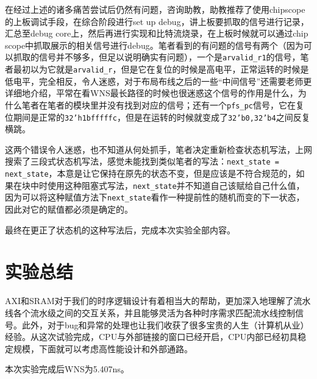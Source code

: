 \documentclass[UTF-8,twoside,c5size]{ctexart}
\begin{document}
    在经过上述的诸多痛苦尝试后仍然有问题，咨询助教，助教推荐了使用chipscope的上板调试手段，在综合阶段进行set up debug，讲上板要抓取的信号进行记录，汇总至debug core上，然后再进行实现和比特流烧录，在上板时候就可以通过chip scope中抓取展示的相关信号进行debug。笔者看到的有问题的信号有两个（因为可以抓取的信号并不够多，但足以说明确实有问题），一个是\texttt{arvalid_r1}的信号，笔者最初以为它就是\texttt{arvalid_r}，但是它在复位的时候是高电平，正常运转的时候是低电平，完全相反，令人迷惑，对于布局布线之后的一些“中间信号”还需要老师更详细地介绍，平常在看WNS最长路径的时候也很迷惑这个信号的作用是什么，为什么笔者在笔者的模块里并没有找到对应的信号；还有一个\texttt{pfs_pc}信号，它在复位期间是正常的\texttt{32'h1bfffffc}，但是在运转的时候就变成了\texttt{32'b0,32'b4}之间反复横跳。
    
    这两个错误令人迷惑，也不知道从何处抓手，笔者决定重新检查状态机写法，上网搜索了三段式状态机写法，感觉未能找到类似笔者的写法：\texttt{next_state = next_state}，本意是让它保持在原先的状态不变，但是应该是不符合规范的，如果在块中时使用这种阻塞式写法，\texttt{next_state}并不知道自己该赋给自己什么值，因为可以将这种赋值方法下\texttt{next_state}看作一种提前性的随机而变的下一状态，因此对它的赋值都必须是确定的。
    
    最终在更正了状态机的这种写法后，完成本次实验全部内容。
	
	\section{实验总结}
	
	AXI和SRAM对于我们的时序逻辑设计有着相当大的帮助，更加深入地理解了流水线各个流水级之间的交互关系，并且能够灵活为各种时序需求匹配流水线控制信号。此外，对于bug和异常的处理也让我们收获了很多宝贵的人生（计算机从业）经验。从这次试验完成，CPU与外部链接的窗口已经开启，CPU内部已经初具稳定规模，下面就可以考虑高性能设计和外部通路。
    
    本次实验完成后WNS为5.407ns。
	
\end{document}
